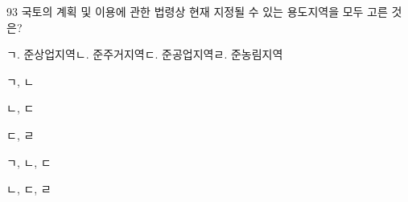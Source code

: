 \begin{question}{93}
국토의 계획 및 이용에 관한 법령상 현재 지정될 수 있는 용도지역을 모두 고른 것은?
\begin{framedtext}
ㄱ. 준상업지역\quad ㄴ. 준주거지역\quad ㄷ. 준공업지역\quad ㄹ. 준농림지역 \par
\end{framedtext}
\begin{choices}
  \item ㄱ, ㄴ
  \item ㄴ, ㄷ
  \item ㄷ, ㄹ
  \item ㄱ, ㄴ, ㄷ
  \item ㄴ, ㄷ, ㄹ
\end{choices}
\end{question}
